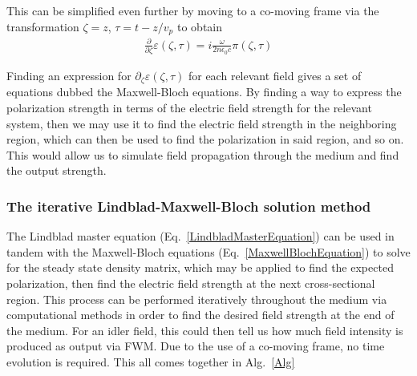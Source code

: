 \documentclass[aps,pra,showpacs,amsmath,amssymb,nofootinbib,longbibliography,superscriptaddress
]{revtex4-1}
\theoremstyle{definition}
\theoremstyle{remark}
\newcommand{\0}{\hat{0}}
\begin{document}
This can be simplified even further by moving to a co-moving frame via the transformation $\zeta = z$, $\tau = t - z / v_p$ to obtain~\cite{MacRae}
\begin{align}\label{MaxwellBlochEquation}
    \frac{\partial}{\partial \zeta} \varepsilon(\zeta, \tau) = i \frac{ \omega}{2n \epsilon_0 c} \pi(\zeta, \tau)
\end{align}

Finding an expression for $\partial_\zeta \varepsilon(\zeta, \tau)$ for each relevant field gives a set of equations dubbed the Maxwell-Bloch equations. By finding a way to express the polarization strength in terms of the electric field strength for the relevant system, then we may use it to find the electric field strength in the neighboring region, which can then be used to find the polarization in said region, and so on. This would allow us to simulate field propagation through the medium and find the output strength.



\subsubsection{The iterative Lindblad-Maxwell-Bloch solution method}\label{iterativeLMB}

The Lindblad master equation (Eq.~\eqref{LindbladMasterEquation}) can be used in tandem with the Maxwell-Bloch equations (Eq.~\eqref{MaxwellBlochEquation}) to solve for the steady state density matrix, which may be applied to find the expected polarization, then find the electric field strength at the next cross-sectional region. This process can be performed iteratively throughout the medium via computational methods in order to find the desired field strength at the end of the medium. For an idler field, this could then tell us how much field intensity is produced as output via FWM. Due to the use of a co-moving frame, no time evolution is required. This all comes together in Alg.~\ref{Alg}
\end{document}
